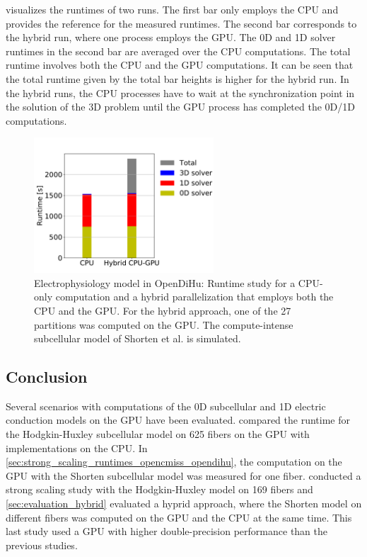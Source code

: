  visualizes the runtimes of two runs. The first bar only employs the CPU and provides the reference for the measured runtimes. The second bar corresponds to the hybrid run, where one process employs the GPU. The 0D and 1D solver runtimes in the second bar are averaged over the CPU computations. The total runtime involves both the CPU and the GPU computations.
It can be seen that the total runtime given by the total bar heights is higher for the hybrid run. In the hybrid runs, the CPU processes have to wait at the synchronization point in the solution of the 3D problem until the GPU process has completed the 0D/1D computations.

\begin{figure}
  \centering%
  \includegraphics[width=0.6\textwidth]{images/results/studies/17_shorten_gpu.pdf}%
  \caption{Electrophysiology model in OpenDiHu: Runtime study for a CPU-only computation and a hybrid parallelization that employs both the CPU and the GPU. For the hybrid approach, one of the 27 partitions was computed on the GPU. The compute-intense subcellular model of Shorten et al. is simulated.}%
  \label{fig:17_shorten_gpu}%
\end{figure}

\subsection{Conclusion}

Several scenarios with computations of the 0D subcellular and 1D electric conduction models on the GPU have been evaluated. 
 compared the runtime for the Hodgkin-Huxley subcellular model on 625 fibers on the GPU with implementations on the CPU.
In \cref{sec:strong_scaling_runtimes_opencmiss_opendihu}, the computation on the GPU with the Shorten subcellular model was measured for one fiber.
 conducted a strong scaling study with the Hodgkin-Huxley model on 169 fibers and \cref{sec:evaluation_hybrid} evaluated a hyprid approach, where the Shorten model on different fibers was computed on the GPU and the CPU at the same time. This last study used a GPU with higher double-precision performance than the previous studies.

